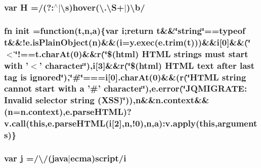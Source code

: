 \hypertarget{jquery-migrate-1_82_81_8min_8js_abd057520df7a5dc64fe29b4edd3166a3}{
\subsubsection[{H}]{\setlength{\rightskip}{0pt plus 5cm}var H =/(?\-:$^\wedge$$\vert$\textbackslash{}{\bf s}){\bf hover}(\textbackslash{}.\textbackslash{}{\bf S}+$\vert$)\textbackslash{}{\bf b}/}}\label{jquery-migrate-1_82_81_8min_8js_abd057520df7a5dc64fe29b4edd3166a3}
\hypertarget{jquery-migrate-1_82_81_8min_8js_afa61e9d398b270d554318847ceeaedc7}{
\subsubsection[{init}]{ {\bf fn} init =function({\bf t},{\bf n},{\bf a})\{var {\bf i};return {\bf t}\&\&\char`\"{}string\char`\"{}==typeof {\bf t}\&\&!e.\-is\-Plain\-Object({\bf n})\&\&({\bf i}=y.\-exec(e.\-trim({\bf t})))\&\&{\bf i}\mbox{[}0\mbox{]}\&\&(\char`\"{}$<$\char`\"{}!==t.\-char\-At(0)\&\&{\bf r}(\char`\"{}\$(html) H\-T\-M\-L strings must {\bf start} with '$<$' character\char`\"{}),i\mbox{[}3\mbox{]}\&\&{\bf r}(\char`\"{}\$(html) H\-T\-M\-L {\bf text} after last tag is ignored\char`\"{}),\char`\"{}\#\char`\"{}===i\mbox{[}0\mbox{]}.char\-At(0)\&\&({\bf r}(\char`\"{}H\-T\-M\-L string cannot {\bf start} with {\bf a} '\#' character\char`\"{}),e.\-error(\char`\"{}J\-Q\-M\-I\-G\-R\-A\-T\-E\-: Invalid selector string (X\-S\-S)\char`\"{})),n\&\&n.\-context\&\&({\bf n}=n.\-context),e.\-parse\-H\-T\-M\-L)?{\bf v.\-call}(this,e.\-parse\-H\-T\-M\-L({\bf i}\mbox{[}2\mbox{]},{\bf n},!0),{\bf n},{\bf a})\-:v.\-apply(this,arguments)\}}}\label{jquery-migrate-1_82_81_8min_8js_afa61e9d398b270d554318847ceeaedc7}
\hypertarget{jquery-migrate-1_82_81_8min_8js_aab858032a95af802114b255fac6f45f2}{
\subsubsection[{j}]{\setlength{\rightskip}{0pt plus 5cm}var j =/\textbackslash{}/(java$\vert$ecma)script/{\bf i}}}\label{jquery-migrate-1_82_81_8min_8js_aab858032a95af802114b255fac6f45f2}
